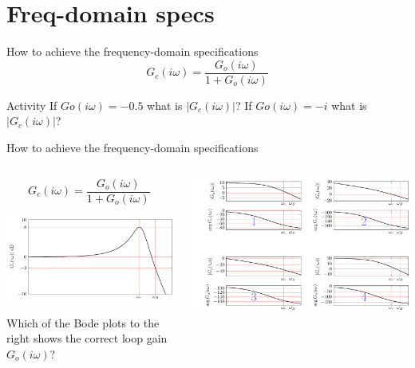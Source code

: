 \documentclass[presentation,aspectratio=169]{beamer}
\begin{document}
\section{Freq-domain specs}
\label{sec:org4f6733a}
\begin{frame}[label={sec:orgd4d0bfd}]{How to achieve the frequency-domain specifications}
\[G_c(i\omega) = \frac{ G_o(i\omega)}{1 + G_o(i\omega)}\]

\alert{Activity}
If \(Go(i\omega) = -0.5\) what is \(|G_c(i\omega)|\)?
If \(Go(i\omega) = -i\) what is \(|G_c(i\omega)|\)?
\end{frame}


\begin{frame}[label={sec:orga286b7d}]{How to achieve the frequency-domain specifications}
\begin{columns}
\begin{column}{0.28\columnwidth}
\[G_c(i\omega) = \frac{ G_o(i\omega)}{1 + G_o(i\omega)}\]

\includegraphics[width=1.1\linewidth]{../../figures/spec-bode-closed-loop-new}

Which of the Bode plots to the right shows the correct loop gain \(G_o(i\omega)\)?
\end{column}

\begin{column}{0.72\columnwidth}
\begin{center}
\includegraphics[width=1.02\linewidth]{../../figures/spec-bode-open-loop-new}
\end{center}
\end{column}
\end{columns}
\end{frame}
\end{document}
